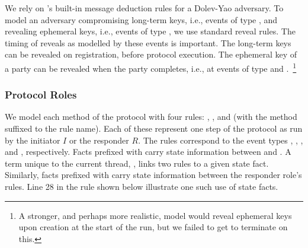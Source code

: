 We rely on \mTamarin's{} built-in message deduction rules for a Dolev-Yao adversary.
%
To model an adversary compromising long-term keys, i.e., events of type
\mRevLTK{}, and revealing ephemeral keys, i.e., events of type
\mRevEph{}, we use standard reveal rules.
%
%
The timing of reveals as modelled by these events is important.
%
The long-term keys can be revealed on registration, before protocol execution.
%
The ephemeral key of a party can be revealed when the party completes,
i.e., at events of type \mIComplete{} and \mRComplete.~\footnote{A stronger, and perhaps more realistic, model would reveal ephemeral keys upon
creation at the start of the run, but we failed to get \mTamarin{} to
terminate on this.}
%

\subsubsection{Protocol Roles}
We model each method of the protocol with four rules: , , 
and  (with the method suffixed to the rule name).
%
Each of these represent one step of the protocol as run by the initiator $I$
or the responder $R$.
%
The rules correspond to the event types \mIStart, \mRStart, \mIComplete,  and
\mRComplete, respectively.%
%
Facts prefixed with  carry state information between  and .
%
A term unique to the current thread, , links two rules to a given state fact.
%
Similarly, facts prefixed with  carry state information between the
responder role's rules.
%
Line 28 in the  rule shown below illustrate one such use of state
facts.
%

